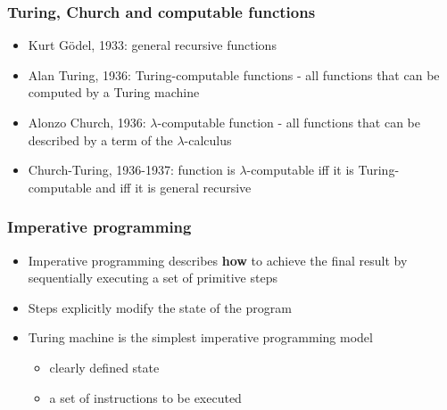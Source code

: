 \documentclass{beamer}
\begin{document}
\begin{frame}
  \frametitle{Turing, Church and computable functions}
  \begin{itemize}
  \item Kurt G\"{o}del, 1933: general recursive functions
  \item Alan Turing, 1936: Turing-computable functions - all functions that can
    be computed by a Turing machine
  \item Alonzo Church, 1936: $\lambda$-computable function - all functions that
    can be described by a term of the $\lambda$-calculus
  \item Church-Turing, 1936-1937: function is $\lambda$-computable iff it is
    Turing-computable and iff it is general recursive
  \end{itemize}
\end{frame}

\begin{frame}[fragile]
  \frametitle{Imperative programming}
  \begin{itemize}
  \item Imperative programming describes \textbf{how} to achieve the final result
    by sequentially executing a set of primitive steps
  \item Steps explicitly modify the state of the program
  \item Turing machine is the simplest imperative programming model
    \begin{itemize}
    \item clearly defined state
    \item a set of instructions to be executed
    \end{itemize}
  \end{itemize}
  \begin{center}
  \end{center}
\end{frame}
\end{document}
